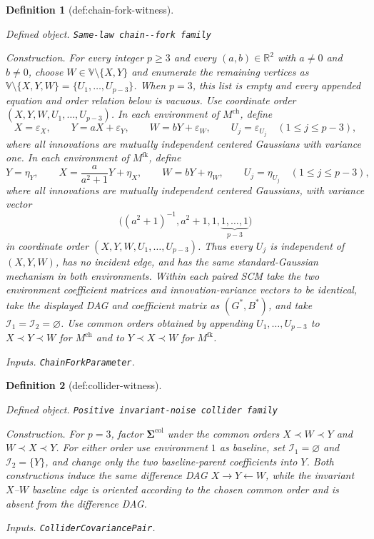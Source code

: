 \documentclass{article}
\newtheorem{definition}{Definition}
\begin{document}
\begin{definition}[def:chain-fork-witness]\label{def:chain-fork-witness}
\par\smallskip\noindent\emph{Defined object.} \texttt{Same-\allowbreak{}law chain-\allowbreak{}-\allowbreak{}fork family}
\par\smallskip\noindent\emph{Construction.} For every integer \(p\ge3\) and every \((a,b)\in\mathbb R^2\) with \(a\neq0\) and \(b\neq0\), choose \(W\in\mathbb V\setminus\{X,Y\}\) and enumerate the remaining vertices as \(\mathbb V\setminus\{X,Y,W\}=\{U_1,\ldots,U_{p-3}\}\).  When \(p=3\), this list is empty and every appended equation and order relation below is vacuous.  Use coordinate order \((X,Y,W,U_1,\ldots,U_{p-3})\).  In each environment of \(M^{\mathrm{ch}}\), define
\[
 X=\varepsilon_X,\qquad Y=aX+\varepsilon_Y,\qquad W=bY+\varepsilon_W,
 \qquad U_j=\varepsilon_{U_j}\quad(1\le j\le p-3),
\]
where all innovations are mutually independent centered Gaussians with variance one.  In each environment of \(M^{\mathrm{fk}}\), define
\[
 Y=\eta_Y,\qquad X=\frac{a}{a^2+1}Y+\eta_X,\qquad W=bY+\eta_W,
 \qquad U_j=\eta_{U_j}\quad(1\le j\le p-3),
\]
where all innovations are mutually independent centered Gaussians, with variance vector
\[
 \bigl((a^2+1)^{-1},a^2+1,1,\underbrace{1,\ldots,1}_{p-3}\bigr)
\]
in coordinate order \((X,Y,W,U_1,\ldots,U_{p-3})\).  Thus every \(U_j\) is independent of \((X,Y,W)\), has no incident edge, and has the same standard-Gaussian mechanism in both environments.  Within each paired SCM take the two environment coefficient matrices and innovation-variance vectors to be identical, take the displayed DAG and coefficient matrix as \((G^*,B^*)\), and take \(\mathcal I_1=\mathcal I_2=\varnothing\).  Use common orders obtained by appending \(U_1,\ldots,U_{p-3}\) to \(X\prec Y\prec W\) for \(M^{\mathrm{ch}}\) and to \(Y\prec X\prec W\) for \(M^{\mathrm{fk}}\).
\par\smallskip\noindent\emph{Inputs.} \texttt{ChainForkParameter}.
\end{definition}

\begin{definition}[def:collider-witness]\label{def:collider-witness}
\par\smallskip\noindent\emph{Defined object.} \texttt{Positive invariant-\allowbreak{}noise collider family}
\par\smallskip\noindent\emph{Construction.} For \(p=3\), factor \(\boldsymbol\Sigma^{\mathrm{col}}\) under the common orders \(X\prec W\prec Y\) and \(W\prec X\prec Y\). For either order use environment \(1\) as baseline, set \(\mathcal I_1=\varnothing\) and \(\mathcal I_2=\{Y\}\), and change only the two baseline-parent coefficients into \(Y\). Both constructions induce the same difference DAG \(X\to Y\leftarrow W\), while the invariant \(X\)--\(W\) baseline edge is oriented according to the chosen common order and is absent from the difference DAG.
\par\smallskip\noindent\emph{Inputs.} \texttt{ColliderCovariancePair}.
\end{definition}
\end{document}
